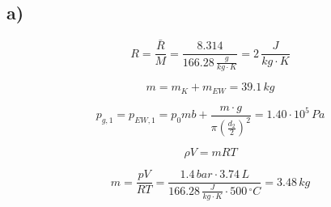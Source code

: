 

\subsection*{a)}
\begin{equation*}
    R = \frac{\bar{R}}{M} = \frac{8.314}{166.28 \, \frac{g}{kg \cdot K}} = 2 \, \frac{J}{kg \cdot K}
\end{equation*}

\begin{equation*}
    m = m_K + m_{EW} = 39.1 \, kg
\end{equation*}

\begin{equation*}
    p_{g,1} = p_{EW,1} = p_0 m b + \frac{m \cdot g}{\pi \left( \frac{d_2}{2} \right)^2} = 1.40 \cdot 10^5 \, Pa
\end{equation*}

\begin{equation*}
    \rho V = mRT
\end{equation*}

\begin{equation*}
    m = \frac{pV}{RT} = \frac{1.4 \, bar \cdot 3.74 \, L}{166.28 \, \frac{J}{kg \cdot K} \cdot 500 \, ^\circ C} = 3.48 \, kg
\end{equation*}